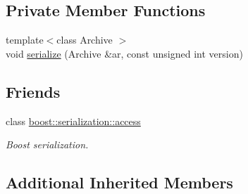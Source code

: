 \subsection*{Private Member Functions}
\begin{DoxyCompactItemize}
\item 
{\footnotesize template$<$class Archive $>$ }\\void \hyperlink{class_go_s_u_m_1_1_c_d_sample_h_c_a76df4a63843bc673d381c5410bc86c6d}{serialize} (Archive \&ar, const unsigned int version)
\end{DoxyCompactItemize}
\subsection*{Friends}
\begin{DoxyCompactItemize}
\item 
class \hyperlink{class_go_s_u_m_1_1_c_d_sample_h_c_ac98d07dd8f7b70e16ccb9a01abf56b9c}{boost\-::serialization\-::access}
\begin{DoxyCompactList}\small\item\em Boost serialization. \end{DoxyCompactList}\end{DoxyCompactItemize}
\subsection*{Additional Inherited Members}


